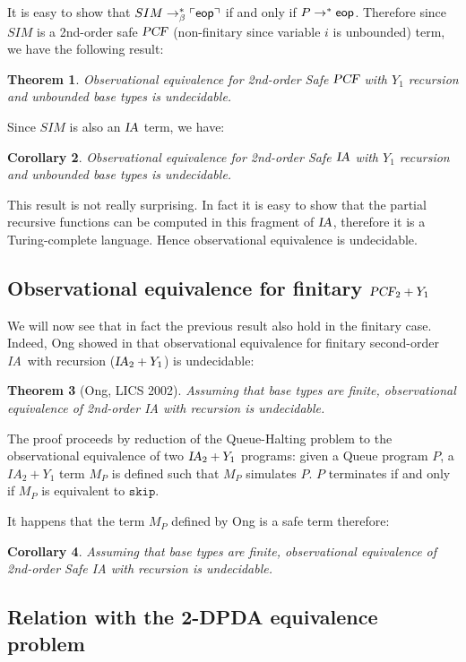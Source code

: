 \documentclass{article}
\newtheorem{theorem}{Theorem}[section]
\newtheorem{corollary}[theorem]{Corollary}
\newcommand{\encode}[1]{\ulcorner #1 \urcorner}
\newcommand\eop{{\sf eop}}
\newcommand{\betared}{\rightarrow_\beta}
\newcommand\ialgol{{\textsl{IA}}}
\newcommand\pcf{\textsl{PCF}}
\newcommand\iaskip{\texttt{skip}}
\begin{document}
It is easy to show that $SIM \betared^* \encode{\eop}$ if and only if $P \rightarrow^* \eop$. Therefore since $SIM$ is a 2nd-order safe $\pcf$
(non-finitary since variable $i$ is unbounded) term, we have the following result:
\begin{theorem}
Observational equivalence for 2nd-order Safe $\pcf$ with $Y_1$ recursion and unbounded base types is undecidable.
\end{theorem}
Since $SIM$ is also an $\ialgol$ term, we have:
\begin{corollary}
Observational equivalence for 2nd-order Safe $\ialgol$ with $Y_1$ recursion and unbounded base types is undecidable.
\end{corollary}

This result is not really surprising. In fact it is easy to show that the partial recursive functions can be computed in this fragment of $\ialgol$, therefore it is a Turing-complete language. Hence observational equivalence is undecidable.


\subsection{Observational equivalence for finitary $\pcf_2 + Y_1$}

We will now see that in fact the previous result also hold in the
finitary case. Indeed, Ong showed in \cite{Ong02} that
observational equivalence for finitary second-order \ialgol\ with
recursion ($\ialgol_2 + Y_1$) is undecidable:
\begin{theorem}[Ong, LICS 2002]
Assuming that base types are finite, observational equivalence of 2nd-order IA with recursion is undecidable.
\end{theorem}

The proof proceeds by reduction of the Queue-Halting problem to the
observational equivalence of two $\ialgol_2 + Y_1$ programs: given a
Queue program $P$, a $IA_2 + Y_1$ term $M_P$ is defined such that
$M_P$ simulates $P$. $P$ terminates if and only if $M_P$ is
equivalent to $\iaskip$.

It happens that the term $M_P$ defined by Ong is a safe term
therefore:
\begin{corollary}
Assuming that base types are finite, observational equivalence of 2nd-order Safe IA with recursion is undecidable.
\end{corollary}

\subsection{Relation with the 2-DPDA equivalence problem}
\end{document}
